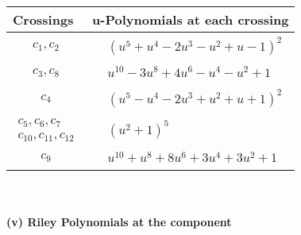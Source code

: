 \documentclass[1p]{elsarticle_modified}
\theoremstyle{definition}
\begin{document}
\begin{tabular}{m{50pt}|m{274pt}}
Crossings & \hspace{64pt}u-Polynomials at each crossing \\
\hline $$\begin{aligned}c_{1},c_{2}\end{aligned}$$&$\begin{aligned}
&(u^5+u^4-2 u^3- u^2+u-1)^2
\end{aligned}$\\
\hline $$\begin{aligned}c_{3},c_{8}\end{aligned}$$&$\begin{aligned}
&u^{10}-3 u^8+4 u^6- u^4- u^2+1
\end{aligned}$\\
\hline $$\begin{aligned}c_{4}\end{aligned}$$&$\begin{aligned}
&(u^5- u^4-2 u^3+u^2+u+1)^2
\end{aligned}$\\
\hline $$\begin{aligned}c_{5},c_{6},c_{7}\\c_{10},c_{11},c_{12}\end{aligned}$$&$\begin{aligned}
&(u^2+1)^5
\end{aligned}$\\
\hline $$\begin{aligned}c_{9}\end{aligned}$$&$\begin{aligned}
&u^{10}+u^8+8 u^6+3 u^4+3 u^2+1
\end{aligned}$\\
\hline
\end{tabular}\\~\\
\newpage\renewcommand{\arraystretch}{1}
\flushleft \textbf{(v) Riley Polynomials at the component}\newline \\
\end{document}
